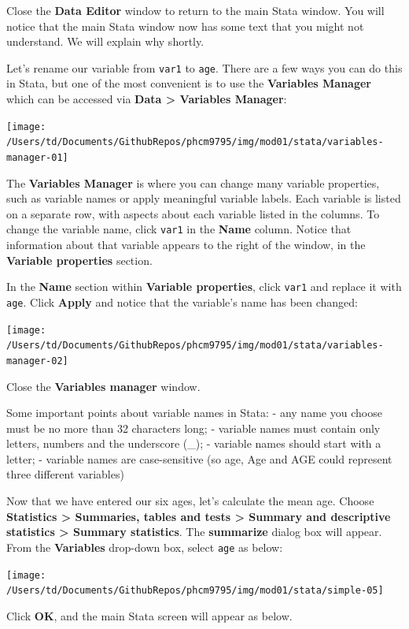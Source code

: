 \documentclass[
]{memoir}
\begin{document}
Close the \textbf{Data Editor} window to return to the main Stata window. You will notice that the main Stata window now has some text that you might not understand. We will explain why shortly.

Let's rename our variable from \texttt{var1} to \texttt{age}. There are a few ways you can do this in Stata, but one of the most convenient is to use the \textbf{Variables Manager} which can be accessed via \textbf{Data \textgreater{} Variables Manager}:

\texttt{[image: /Users/td/Documents/GithubRepos/phcm9795/img/mod01/stata/variables-manager-01]}

The \textbf{Variables Manager} is where you can change many variable properties, such as variable names or apply meaningful variable labels. Each variable is listed on a separate row, with aspects about each variable listed in the columns. To change the variable name, click \texttt{var1} in the \textbf{Name} column. Notice that information about that variable appears to the right of the window, in the \textbf{Variable properties} section.

In the \textbf{Name} section within \textbf{Variable properties}, click \texttt{var1} and replace it with \texttt{age}. Click \textbf{Apply} and notice that the variable's name has been changed:

\texttt{[image: /Users/td/Documents/GithubRepos/phcm9795/img/mod01/stata/variables-manager-02]}

Close the \textbf{Variables manager} window.

Some important points about variable names in Stata:
- any name you choose must be no more than 32 characters long;
- variable names must contain only letters, numbers and the underscore (\_);
- variable names should start with a letter;
- variable names are case-sensitive (so age, Age and AGE could represent three different variables)

Now that we have entered our six ages, let's calculate the mean age. Choose \textbf{Statistics \textgreater{} Summaries, tables and tests \textgreater{} Summary and descriptive statistics \textgreater{} Summary statistics}. The \textbf{summarize} dialog box will appear. From the \textbf{Variables} drop-down box, select \texttt{age} as below:

\texttt{[image: /Users/td/Documents/GithubRepos/phcm9795/img/mod01/stata/simple-05]}

Click \textbf{OK}, and the main Stata screen will appear as below.
\end{document}
